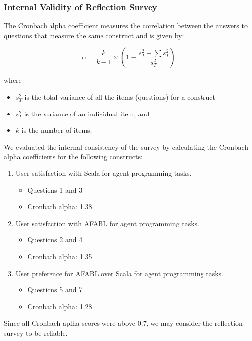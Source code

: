 \subsubsection{Internal Validity of Reflection Survey}

The Cronbach alpha coefficient measures the correlation between the answers to questions that measure the same construct and is given by:

\[
\alpha = \frac{k}{k - 1} \times (1 - \frac{s_{T}^{2} - \sum s_{I}^{2}}{s_{T}^{2}})
\]

where
\begin{itemize}
\item $s_T^2$ is the total variance of all the items (questions) for a construct
\item $s_I^2$ is the variance of an individual item, and
\item $k$ is the number of items.
\end{itemize}

We evaluated the internal consistency of the survey by calculating the Cronbach alpha coefficients for the following constructs:

\begin{enumerate}

\item User satisfaction with Scala for agent programming tasks.
\begin{itemize}
\item Questions 1 and 3
\item Cronbach alpha: 1.38
\end{itemize}

\item User satisfaction with AFABL for agent programming tasks.
\begin{itemize}
\item  Questions 2 and 4
\item Cronbach alpha: 1.35
\end{itemize}

\item User preference for AFABL over Scala for agent programming tasks.
\begin{itemize}
\item Questions 5 and 7
\item Cronbach alpha: 1.28
\end{itemize}

\end{enumerate}

Since all Cronbach aplha scores were above 0.7, we may consider the reflection survey to be reliable.

